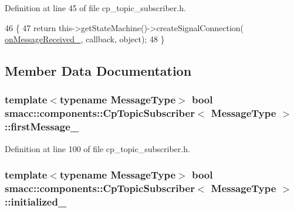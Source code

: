 Definition at line 45 of file cp\+\_\+topic\+\_\+subscriber.\+h.


\begin{DoxyCode}
46     \{
47         \textcolor{keywordflow}{return} this->getStateMachine()->createSignalConnection(
      \hyperlink{classsmacc_1_1components_1_1CpTopicSubscriber_aeec04e64cad880bd49d401c2a474c6e9}{onMessageReceived\_}, callback, \textcolor{keywordtype}{object});
48     \}
\end{DoxyCode}


\subsection{Member Data Documentation}
\subsubsection[{\texorpdfstring{first\+Message\+\_\+}{firstMessage_}}]{\setlength{\rightskip}{0pt plus 5cm}template$<$typename Message\+Type$>$ {\bf bool} {\bf smacc\+::components\+::\+Cp\+Topic\+Subscriber}$<$ Message\+Type $>$\+::first\+Message\+\_\+\hspace{0.3cm}{\ttfamily [private]}}\hypertarget{classsmacc_1_1components_1_1CpTopicSubscriber_aadbaf8c0f0a2a5bea38f41356528f41c}{}\label{classsmacc_1_1components_1_1CpTopicSubscriber_aadbaf8c0f0a2a5bea38f41356528f41c}


Definition at line 100 of file cp\+\_\+topic\+\_\+subscriber.\+h.

\subsubsection[{\texorpdfstring{initialized\+\_\+}{initialized_}}]{\setlength{\rightskip}{0pt plus 5cm}template$<$typename Message\+Type$>$ {\bf bool} {\bf smacc\+::components\+::\+Cp\+Topic\+Subscriber}$<$ Message\+Type $>$\+::initialized\+\_\+\hspace{0.3cm}{\ttfamily [private]}}\hypertarget{classsmacc_1_1components_1_1CpTopicSubscriber_a666e60629820ef146ade691a36c41e0a}{}\label{classsmacc_1_1components_1_1CpTopicSubscriber_a666e60629820ef146ade691a36c41e0a}


